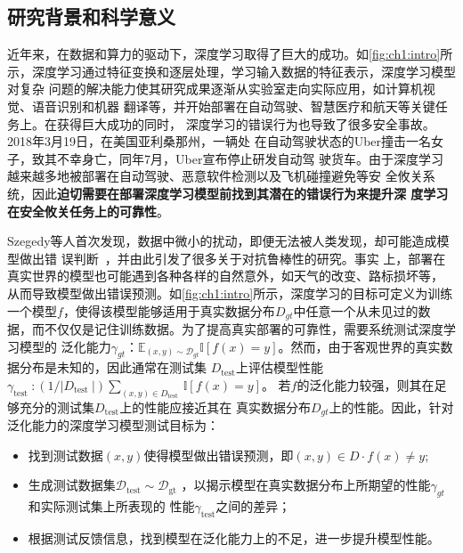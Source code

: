 
\subsection{研究背景和科学意义}



%
近年来，在数据和算力的驱动下，深度学习取得了巨大的成功。如\cref{fig:ch1:intro}所
示，深度学习通过特征变换和逐层处理，学习输入数据的特征表示，深度学习模型对复杂
问题的解决能力使其研究成果逐渐从实验室走向实际应用，如计算机视觉、语音识别和机器
翻译等，并开始部署在自动驾驶、智慧医疗和航天等关键任务上。在获得巨大成功的同时，
深度学习的错误行为也导致了很多安全事故。2018年3月19日，在美国亚利桑那州，一辆处
在自动驾驶状态的Uber撞击一名女子，致其不幸身亡，同年7月，Uber宣布停止研发自动驾
驶货车。由于深度学习越来越多地被部署在自动驾驶、恶意软件检测以及飞机碰撞避免等安
全攸关系统，因此\textbf{迫切需要在部署深度学习模型前找到其潜在的错误行为来提升深
度学习在安全攸关任务上的可靠性}。

Szegedy等人首次发现，数据中微小的扰动，即便无法被人类发现，却可能造成模型做出错
误判断~\cite{szegedy2013intriguing}，并由此引发了很多关于对抗鲁棒性的研究。事实
上，部署在真实世界的模型也可能遇到各种各样的自然意外，如天气的改变、路标损坏等，
从而导致模型做出错误预测。如\cref{fig:ch1:intro}所示，深度学习的目标可定义为训练
一个模型${f}$，使得该模型能够适用于真实数据分布$D_{gt}$中任意一个从未见过的数
据，而不仅仅是记住训练数据。为了提高真实部署的可靠性，需要系统测试深度学习模型的
泛化能力$\gamma_{gt}$：$\mathbb{E}_{(x, y) \sim \mathcal{D}_{g t}}
\mathbb{I}[f(x)=y]$。然而，由于客观世界的真实数据分布是未知的，因此通常在测试集
$D_{\text{test}}$上评估模型性能$\gamma_{\text {test }}:\left(1 /\left|D_{\text
{test }}\right|\right) \sum_{(x, y) \in D_{\text {test }}} \mathbb{I}[f(x)=y]$。
若${f}$的泛化能力较强，则其在足够充分的测试集$D_{\text{test}}$上的性能应接近其在
真实数据分布$D_{gt}$上的性能。因此，针对泛化能力的深度学习模型测试目标为：
\begin{itemize}
    \item 找到测试数据$(x, y)$使得模型做出错误预测，即$(x, y) \in D \cdot f(x)
    \neq y$;
    \item 生成测试数据集$\mathcal{D}_{\text{test}} \sim \mathcal{D}_{\text{gt}}$
    ，以揭示模型在真实数据分布上所期望的性能$\gamma_{gt}$和实际测试集上所表现的
    性能$\gamma_{\text{test}}$之间的差异；
    \item 根据测试反馈信息，找到模型在泛化能力上的不足，进一步提升模型性能。
\end{itemize}


